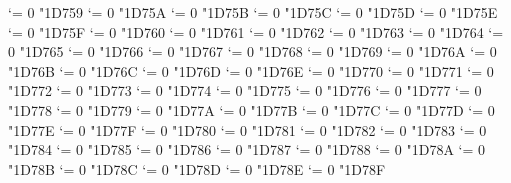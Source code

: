 {  \Umathcode `\Δ = 0 \unimathfam "1D759
  \Umathcode `\Ε = 0 \unimathfam "1D75A
  \Umathcode `\Ζ = 0 \unimathfam "1D75B
  \Umathcode `\Η = 0 \unimathfam "1D75C
  \Umathcode `\Θ = 0 \unimathfam "1D75D
  \Umathcode `\Ι = 0 \unimathfam "1D75E
  \Umathcode `\Κ = 0 \unimathfam "1D75F
  \Umathcode `\Λ = 0 \unimathfam "1D760
  \Umathcode `\Μ = 0 \unimathfam "1D761
  \Umathcode `\Ν = 0 \unimathfam "1D762
  \Umathcode `\Ξ = 0 \unimathfam "1D763
  \Umathcode `\Ο = 0 \unimathfam "1D764
  \Umathcode `\Π = 0 \unimathfam "1D765
  \Umathcode `\Ρ = 0 \unimathfam "1D766
  \Umathcode `\ϴ = 0 \unimathfam "1D767
  \Umathcode `\Σ = 0 \unimathfam "1D768
  \Umathcode `\Τ = 0 \unimathfam "1D769
  \Umathcode `\Υ = 0 \unimathfam "1D76A
  \Umathcode `\Φ = 0 \unimathfam "1D76B
  \Umathcode `\Χ = 0 \unimathfam "1D76C
  \Umathcode `\Ψ = 0 \unimathfam "1D76D
  \Umathcode `\Ω = 0 \unimathfam "1D76E
  \Umathcode `\α = 0 \unimathfam "1D770
  \Umathcode `\β = 0 \unimathfam "1D771
  \Umathcode `\γ = 0 \unimathfam "1D772
  \Umathcode `\δ = 0 \unimathfam "1D773
  \Umathcode `\ε = 0 \unimathfam "1D774
  \Umathcode `\ζ = 0 \unimathfam "1D775
  \Umathcode `\η = 0 \unimathfam "1D776
  \Umathcode `\θ = 0 \unimathfam "1D777
  \Umathcode `\ι = 0 \unimathfam "1D778
  \Umathcode `\κ = 0 \unimathfam "1D779
  \Umathcode `\λ = 0 \unimathfam "1D77A
  \Umathcode `\μ = 0 \unimathfam "1D77B
  \Umathcode `\ν = 0 \unimathfam "1D77C
  \Umathcode `\ξ = 0 \unimathfam "1D77D
  \Umathcode `\ο = 0 \unimathfam "1D77E
  \Umathcode `\π = 0 \unimathfam "1D77F
  \Umathcode `\ρ = 0 \unimathfam "1D780
  \Umathcode `\ς = 0 \unimathfam "1D781
  \Umathcode `\σ = 0 \unimathfam "1D782
  \Umathcode `\τ = 0 \unimathfam "1D783
  \Umathcode `\υ = 0 \unimathfam "1D784
  \Umathcode `\ϕ = 0 \unimathfam "1D785
  \Umathcode `\χ = 0 \unimathfam "1D786
  \Umathcode `\ψ = 0 \unimathfam "1D787
  \Umathcode `\ω = 0 \unimathfam "1D788
  \Umathcode `\ϵ = 0 \unimathfam "1D78A
  \Umathcode `\ϑ = 0 \unimathfam "1D78B
  \Umathcode `\ϰ = 0 \unimathfam "1D78C
  \Umathcode `\φ = 0 \unimathfam "1D78D
  \Umathcode `\ϱ = 0 \unimathfam "1D78E
  \Umathcode `\ϖ = 0 \unimathfam "1D78F
\tensfbf}
\let\bfsf=\sfbf

